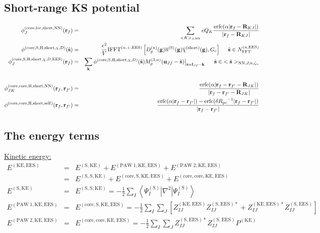\documentclass[paper=a4, fontsize=11pt]{article} %
\numberwithin{equation}{section} %
\numberwithin{figure}{section} %
\numberwithin{table}{section} %
\newcommand{\ol}{\overline}
\newcommand{\bu}{{\bf{u}}}
\newcommand{\bl}{{\bf{l}}}
\newcommand{\bk}{{\bf{k}}}
\newcommand{\bs}{{\bf{s}}}
\newcommand{\bg}{{\bf{g}}}
\newcommand{\br}{{\bf{r}}}
\newcommand{\bR}{{\bf{R}}}
\newcommand{\hs}{{\hat{\bf{s}}}}
\newcommand{\rS}{{\mathrm{S}}}
\newcommand{\rKE}{{\mathrm{KE}}}
\newcommand{\rEES}{{\mathrm{EES}}}
\newcommand{\rcore}{{\mathrm{core}}}
\newcommand{\rNN}{{\mathrm{NN}}}
\newcommand{\rself}{{\mathrm{self}}}
\newcommand{\rshort}{{\mathrm{short}}}
\newcommand{\rerfc}{{\mathrm{erfc}}}
\newcommand{\rP}{{\mathrm{PAW}}}
\newcommand{\rH}{{\mathrm{H}}}
\newcommand{\rlo}{{\mathrm{loc}}}
\newcommand{\NFFTnEES}{{N^{(n,\rEES)}_{\mathrm{FFT}}}}
\newcommand{\Gc}{{G_{\mathrm{c}}}}
\newcommand{\Rpc}{{R_{\mathrm{pc}}}}
\newcommand{\Dng}{{D^{(n)}_p(\bg)}}
\newcommand{\Mn}{{M_p^{(3,n)}}}
\newcommand{\IFFTnEES}{{\mathrm{IFFT}^{(n,+,\rEES)}}}
\newcommand{\hsJn}{{<\hs>_{\rNN,J,n,\zeta_n}}}
\newcommand{\hsinJn}{{\ \ \ \ \ \hs  \in  \hsJn}}
\newcommand{\hsinnEES}{{\ \ \ \ \hs \in \NFFTnEES}}
\begin{document}
\subsection{Short-range KS potential}
\begin{eqnarray}
\label{phi:fshortNN}
\phi_J^{(\rcore,\rlo,\rshort,\rNN)}(\br_f) &=& \sum_{<K>_{J,\rNN}}eQ_K\frac{\rerfc(\alpha|\br_f-\bR_{KJ}|)}{|\br_f-\bR_{KJ}|}\\
\label{phi:scoreSHshortchiD}
\phi^{(\rcore,\rS,\rH,\rshort,\chi,D)}(\hs) &=&\frac{e^2}{V} \IFFTnEES\left[\Dng \ol n^{(\rS)}(\bg)\ol \chi^{(\rshort)}(\bg),\Gc\right] \hsinnEES \\
\label{phi:fSchiEES}
\phi_J^{(\rcore,\rS,\rH,\rshort,\chi,D,\rEES)}(\br_f) &=&\sum_{\bk} \phi^{(\rcore,\rS,\rH,\rshort,\chi,D)}(\hs)\Mn(\bu_{Jf}-\hat \bs)\big|_{\hat \bs=\bl_{Jf}-\bk} \hsinJn \nonumber\\
\\
\label{phi:fHshortNN}
\phi_{JK}^{(\rcore,\rcore,\rH,\rshort,\rNN)}(\br_f,\br_{f'}) &=& \frac{\rerfc(\alpha|\br_f-\br_{f'}-\bR_{JK}|)}{|\br_f-\br_{f'}-\bR_{JK}|} \\
\label{phi:fHshortself}
\phi^{(\rcore,\rcore,\rH,\rshort,\rself)}(\br_f,\br_{f'})&=&\frac{\rerfc(\alpha|\br_f-\br_{f'}|)-\rerfc(\delta \Rpc^{-1}|\br_f-\br_{f'}|)}{|\br_f-\br_{f'}|}
\end{eqnarray}


\subsection{The energy terms}

\underline{Kinetic energy:}
\begin{eqnarray}
E^{(\rKE,\rEES)}
&=& E^{(\rS,\rKE)}+ E^{(\rP\ 1,\rKE,\rEES)} + E^{(\rP\ 2,\rKE,\rEES)} \nonumber\\
&=&E^{(\rS,\rS,\rKE)}+ E^{(\rcore,\rS,\rKE,\rEES)} + E^{(\rcore,\rcore,\rKE,\rEES)} \\
E^{(\rS,\rKE)}&=& E^{(\rS,\rS,\rKE)}
= -\frac{1}{2}\sum_I \left<\Psi_I^{(\rS)}|\nabla^2|\Psi_I^{(\rS)}\right> \\
E^{(\rP\ 1,\rKE,\rEES)}&=&E^{(\rcore,\rS,\rKE,\rEES)}
= -\frac{1}{2}\sum_I \sum_J \left[Z_{IJ}^{(\rKE,\rEES)}Z_{IJ}^{(\rS,\rEES)*} + Z_{IJ}^{(\rKE,\rEES)*}Z_{IJ}^{(\rS,\rEES)} \right]\\
E^{(\rP\ 2,\rKE,\rEES)}&=&E^{(\rcore,\rcore,\rKE,\rEES)}
= -\frac{1}{2}\sum_I \sum_J Z_{IJ}^{(\rS,\rEES)*}Z_{IJ}^{(\rS,\rEES)}P^{(\rKE)}
\end{eqnarray}
\end{document}
